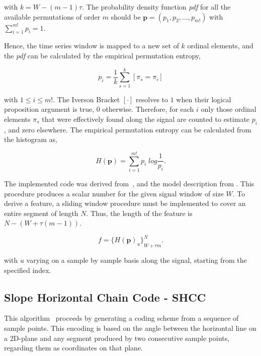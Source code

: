 \documentclass[brainsci,article,submit,moreauthors,pdftex,10pt,a4paper]{mdpi}
\begin{document}
\noindent with $k = W-(m-1) \tau$.  The probability density function \textit{pdf} for all the available permutations of order $m$ should be $ \textbf{p} = (p_1,p_2,...,p_{m!}) $ with $ \sum_{i=1}^{m!} p_{i} = 1 $.

Hence, the time series window is mapped to a new set of $k$ ordinal elements, and the \textit{pdf} can be calculated by the empirical permutation entropy,

\begin{equation}
p_i = \frac{1}{k} \sum_{s=1}^{k} \left[ \pi_{s} = \pi_{i} \right]
\label{eq:pe4}
\end{equation}

\noindent with $1 \leq i \leq m!$. The Iverson Bracket $ \left[ \cdot \right] $ resolves to $1$ when their logical proposition argument is true, $0$ otherwise. Therefore, for each $i$ only those ordinal elements $\pi_{s}$ that were effectively found along the signal are counted to estimate $p_i$, and zero elsewhere.  The empirical permutation entropy can be calculated from the histogram as,

\begin{equation}
H(\textbf{p}) = \sum_{i=1}^{m!} p_{i} \; log \frac{1}{p_{i}}.
\label{eq:pe5}
\end{equation}

The implemented code was derived from~\citep{Unakafova2013}, and the model description from \citep{Berger2017}.  This procedure produces a scalar number for the given signal window of size $W$.  To derive a feature, a sliding window procedure must be implemented to cover an entire segment of length $N$.  Thus, the length of the feature is $N - (W + \tau (m - 1))$.

\begin{equation}
f =  {\bigg \{ H(\textbf{p})_{u} \bigg \}}_{W + \tau  m}^{N}.
\label{eq:pe6}
\end{equation}

\noindent with $u$ varying on a sample by sample basis along the signal, starting from the specified index.

\subsection{Slope Horizontal Chain Code - SHCC}

This algorithm~\citep{Alvarado-Gonzalez2016} proceeds by generating a coding scheme from a sequence of sample points. This encoding is based on the angle between the horizontal line on a 2D-plane and any segment produced by two consecutive sample points, regarding them as coordinates on that plane.  
\end{document}
